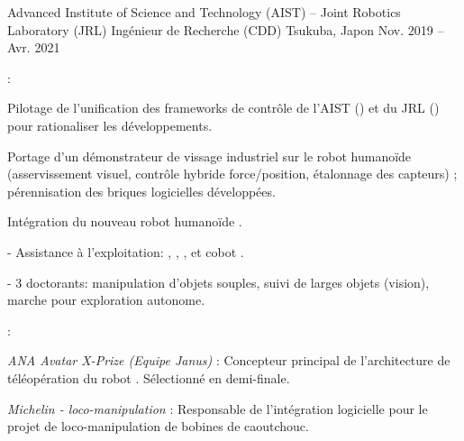 \begin{cventries}
  \cventry
  {Advanced Institute of Science and Technology (AIST) -- Joint Robotics Laboratory (JRL)} %
  {Ingénieur de Recherche (CDD)} %
  {Tsukuba, Japon} %
  {Nov. 2019 -- Avr. 2021} %
  {
    \begin{cvitems} %
    \item {} :
      \begin{subitems}
      \item Pilotage de l'unification des frameworks de contrôle de l'AIST () et du JRL
        () pour rationaliser les développements.
      \item Portage d'un démonstrateur de vissage industriel sur le robot humanoïde 
        (asservissement visuel,
        contrôle hybride force/position, étalonnage des capteurs) ; pérennisation des briques logicielles développées.
      \item Intégration du nouveau robot humanoïde .
      \end{subitems}
    \item {} - Assistance à l'exploitation: , ,
      ,  et cobot .
    \item {} - 3 doctorants: manipulation d'objets souples, suivi de larges
      objets (vision), marche pour exploration autonome.
    \item {} :
      \begin{subitems}
      \item \emph{ANA Avatar X-Prize (Equipe Janus)} : Concepteur principal de l'architecture de téléopération
        du robot . Sélectionné en demi-finale.
      \item \emph{Michelin - loco-manipulation} : Responsable de l'intégration logicielle pour le projet de
        loco-manipulation de bobines de caoutchouc.
      \end{subitems}
    \end{cvitems}
  }


\end{cventries}
